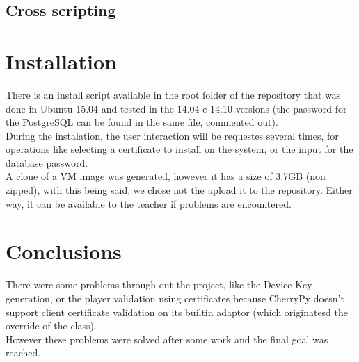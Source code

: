 \documentclass[11pt,a4paper]{report}
\begin{document}
\section{Cross scripting}

\chapter{Installation}

There is an install script available in the root folder of the repository that was done in Ubuntu 15.04 and tested in the 14.04 e 14.10 versions (the password for the PostgreSQL can be found in the same file, commented out).\\

During the instalation, the user interaction will be requestes several times, for operations like selecting a certificate to install on the system, or the input for the database password.\\

A clone of a VM image was generated, however it has a size of 3.7GB (non zipped), with this being said, we chose not the upload it to the repository. Either way, it can be available to the teacher if problems are encountered.

\chapter{Conclusions}

There were some problems through out the project, like the Device Key generation, or the player validation using certificates because CherryPy doesn't support client certificate validation on its builtin adaptor (which originatesd the override of the class).\\

However these problems were solved after some work and the final goal was reached. 





\end{document}
